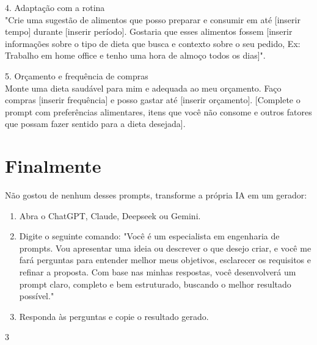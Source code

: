 \documentclass[11pt, a4paper]{article}
\begin{document}
4. Adaptação com a rotina \\
"Crie uma sugestão de alimentos que posso preparar e consumir em até [inserir tempo] durante [inserir período]. Gostaria que esses alimentos fossem [inserir informações sobre o tipo de dieta que busca e contexto sobre o seu pedido, Ex: Trabalho em home office e tenho uma hora de almoço todos os dias]".

5. Orçamento e frequência de compras \\
Monte uma dieta saudável para mim e adequada ao meu orçamento. Faço compras [inserir frequência] e posso gastar até [inserir orçamento]. [Complete o prompt com preferências alimentares, itens que você não consome e outros fatores que possam fazer sentido para a dieta desejada]. 

\section*{Finalmente}
Não gostou de nenhum desses prompts, transforme a própria IA em um gerador:
\begin{enumerate}
	\item Abra o ChatGPT, Claude, Deepseek ou Gemini.
	\item Digite o seguinte comando: "Você é um especialista em engenharia de prompts. Vou apresentar uma ideia ou descrever o que desejo criar, e você me fará perguntas para entender melhor meus objetivos, esclarecer os requisitos e refinar a proposta. Com base nas minhas respostas, você desenvolverá um prompt claro, completo e bem estruturado, buscando o melhor resultado possível."
	\item Responda às perguntas e copie o resultado gerado.
\end{enumerate}



\begin{thebibliography}{3}
	
\end{thebibliography}
\end{document}
